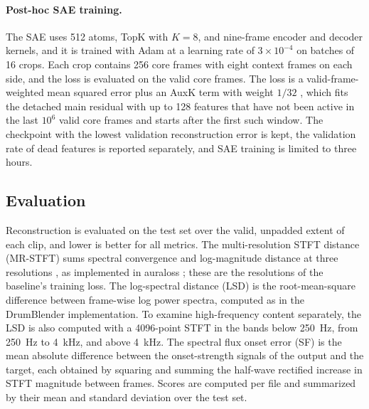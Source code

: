 \paragraph{Post-hoc SAE training.}
The SAE uses 512 atoms, TopK with $K=8$, and nine-frame encoder and decoder kernels, and it is trained with Adam at a learning rate of $3\times10^{-4}$ on batches of 16 crops.
Each crop contains 256 core frames with eight context frames on each side, and the loss is evaluated on the valid core frames.
The loss is a valid-frame-weighted mean squared error plus an AuxK term with weight $1/32$ \citep{gao2025scaling}, which fits the detached main residual with up to 128 features that have not been active in the last $10^6$ valid core frames and starts after the first such window.
The checkpoint with the lowest validation reconstruction error is kept, the validation rate of dead features is reported separately, and SAE training is limited to three hours.

\subsection{Evaluation}
\label{sec:exp-eval}
Reconstruction is evaluated on the test set over the valid, unpadded extent of each clip, and lower is better for all metrics.
The multi-resolution STFT distance (MR-STFT) sums spectral convergence and log-magnitude distance at three resolutions \citep{yamamoto2020parallel}, as implemented in auraloss \citep{steinmetz2020auraloss}; these are the resolutions of the baseline's training loss.
The log-spectral distance (LSD) is the root-mean-square difference between frame-wise log power spectra, computed as in the DrumBlender implementation.
To examine high-frequency content separately, the LSD is also computed with a 4096-point STFT in the bands below 250~Hz, from 250~Hz to 4~kHz, and above 4~kHz.
The spectral flux onset error (SF) is the mean absolute difference between the onset-strength signals of the output and the target, each obtained by squaring and summing the half-wave rectified increase in STFT magnitude between frames.
Scores are computed per file and summarized by their mean and standard deviation over the test set.

